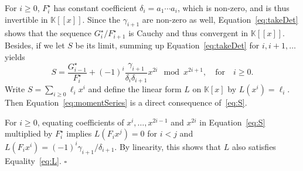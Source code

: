 \documentclass{elsart}
\def\K {\ensuremath{\mathbb{K}}}
\def\foorp{\hfill$\square$}
\begin{document}
For $i\ge 0$, $F_i^\star$ has constant coefficient
$\delta_i=a_1\cdots a_i$, which is non-zero, and is thus invertible in
$\K[[x]]$. Since the $\gamma_{i+1}$ are non-zero as well,
Equation~\eqref{eq:takeDet} shows that the sequence
$G^\star_{i}/F^\star_{i+1}$ is Cauchy and thus convergent in
$\K[[x]]$. Besides, if we let $S$ be its limit, summing up
Equation~\eqref{eq:takeDet} for $i,i+1,\ldots$ yields
\begin{equation} \label{eq:S}
S = \frac{G^\star_{i-1}}{F^\star_{i}} + (-1)^i
  \frac{\gamma_{i+1}}{\delta_i \delta_{i+1}} x^{2i} \mod x^{2i+1}, \quad \text{for} \quad i\geq 0.
\end{equation}
 Write $S=\sum_{i \ge 0} \ell_i x^i$ and define the linear form $L$ on
  $\K[x]$ by $L(x^i)=\ell_i$. Then Equation~\eqref{eq:momentSeries} is
  a direct consequence of~\eqref{eq:S}.
  
  For $i \ge 0$, equating coefficients of $x^i, \ldots, x^{2i-1}$ and
$x^{2i}$ in Equation~\eqref{eq:S} multiplied by ${F^\star_{i}}$
implies $L(F_i x^j) = 0$ for $i < j$ and $L(F_i x^i) = (-1)^i
\gamma_{i+1}/\delta_{i+1}$.  By linearity, this shows that $L$
also satisfies Equality~\eqref{eq:L}.  \foorp
\end{document}
